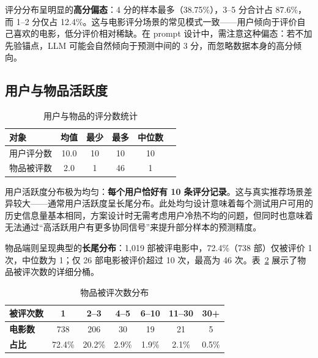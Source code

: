 \documentclass[UTF8,a4paper,10pt,fontset=none]{ctexart}
\begin{document}
评分分布呈明显的\textbf{高分偏态}：4 分的样本最多（38.75\%），3--5 分合计占 87.6\%，而 1--2 分仅占 12.4\%。这与电影评分场景的常见模式一致——用户倾向于评价自己喜欢的电影，低分评价相对稀缺。在 prompt 设计中，需注意这种偏态：若不加先验锚点，LLM 可能会自然倾向于预测中间的 3 分，而忽略数据本身的高分倾向。

\subsection{用户与物品活跃度}

\begin{table}[htbp]
    \centering
    \setlength{\tabcolsep}{20pt}
    \caption{用户与物品的评分数统计}
    \label{tab:activity}
    \begin{tabular}{@{}lccccc@{}}
        \toprule
        \textbf{对象} & \textbf{均值} & \textbf{最少} & \textbf{最多} & \textbf{中位数} \\
        \midrule
        用户评分数 & 10.0 & 10 & 10 & 10 \\
        物品被评数 & 2.0  & 1  & 46 & 1 \\
        \bottomrule
    \end{tabular}
\end{table}

用户活跃度分布极为均匀：\textbf{每个用户恰好有 10 条评分记录}。这与真实推荐场景差异较大——通常用户活跃度呈长尾分布。此处均匀设计意味着每个测试用户可用的历史信息量基本相同，方案设计时无需考虑用户冷热不均的问题，但同时也意味着无法通过“高活跃用户有更多协同信号”来提升部分样本的预测精度。

物品端则呈现典型的\textbf{长尾分布}：1,019 部被评电影中，72.4\%（738 部）仅被评价 1 次，中位数为 1；仅 26 部电影被评价超过 10 次，最高为 46 次。表~\ref{tab:movie_buckets} 展示了物品被评次数的详细分桶。

\begin{table}[htbp]
    \centering
    \setlength{\tabcolsep}{18pt}
    \caption{物品被评次数分布}
    \label{tab:movie_buckets}
    \begin{tabular}{@{}lcccccc@{}}
        \toprule
        \textbf{被评次数} & 1 & 2--3 & 4--5 & 6--10 & 11--30 & 30+ \\
        \midrule
        \textbf{电影数} & 738 & 206 & 30 & 19 & 21 & 5 \\
        \textbf{占比} & 72.4\% & 20.2\% & 2.9\% & 1.9\% & 2.1\% & 0.5\% \\
        \bottomrule
    \end{tabular}
\end{table}
\end{document}
